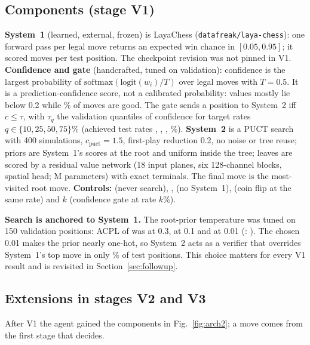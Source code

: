 \subsection{Components (stage V1)}
\textbf{System~1} (learned, external, frozen) is LayaChess (\texttt{datafreak/laya-chess}): one forward pass per legal move returns an expected win chance in $[0.05,0.95]$; it scored \layaScored{} moves per test position. The checkpoint revision was not pinned in V1. \textbf{Confidence and gate} (handcrafted, tuned on validation): confidence is the largest probability of $\mathrm{softmax}(\mathrm{logit}(w_i)/T)$ over legal moves with $T=0.5$. It is a prediction-confidence score, not a calibrated probability: values mostly lie below 0.2 while \goodRateLaya\% of moves are good. The gate sends a position to System~2 iff $c\le\tau$, with $\tau_q$ the validation quantiles of confidence for target rates $q\in\{10,25,50,75\}\%$ (achieved test rates \rateTen, \rateTf, \rateFifty, \rateSf\%). \textbf{System~2} is a PUCT search with 400 simulations, $c_\text{puct}=1.5$, first-play reduction 0.2, no noise or tree reuse; priors are System~1's scores at the root and uniform inside the tree; leaves are scored by a residual value network (18 input planes, six 128-channel blocks, spatial head; \vnParams M parameters) with exact terminals. The final move is the most-visited root move. \textbf{Controls:}  (never search), ,  (no System~1),  (coin flip at the same rate) and $k$ (confidence gate at rate $k\%$).

\textbf{Search is anchored to System~1.} The root-prior temperature was tuned on 150 validation positions: ACPL of  was \swTthree{} at 0.3, \swTone{} at 0.1 and \swTz{} at 0.01 (: \swLaya). The chosen 0.01 makes the prior nearly one-hot, so System~2 acts as a verifier that overrides System~1's top move in only \fracChanged\% of test positions. This choice matters for every V1 result and is revisited in Section~\ref{sec:followup}.

\subsection{Extensions in stages V2 and V3}
\label{sec:arch-v2}
After V1 the agent gained the components in Fig.~\ref{fig:arch2}; a move comes from the first stage that decides.


